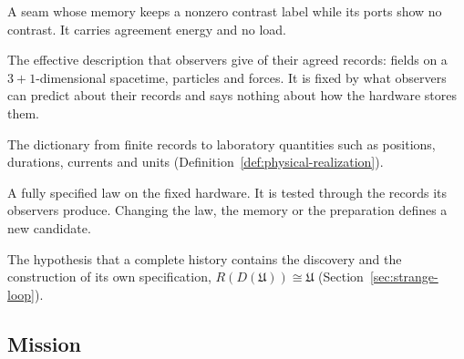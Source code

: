 \documentclass[11pt]{article}
\theoremstyle{definition}
\theoremstyle{remark}
\begin{document}
\begin{description}[leftmargin=1.2em,itemsep=1pt,parsep=0pt]
\item[Unrecovered seam, or collar.] A seam whose memory keeps a nonzero
contrast label while its ports show no contrast. It carries agreement
energy and no load.
\item[Desktop.] The effective description that observers give of their
agreed records: fields on a $3{+}1$-dimensional spacetime, particles and
forces. It is fixed by what observers can predict about their records
and says nothing about how the hardware stores them.
\item[Realization map.] The dictionary from finite records to laboratory
quantities such as positions, durations, currents and units
(Definition~\ref{def:physical-realization}).
\item[Candidate law.] A fully specified law on the fixed hardware. It is
tested through the records its observers produce. Changing the law, the
memory or the preparation defines a new candidate.
\item[Closure.] The hypothesis that a complete history contains the
discovery and the construction of its own specification,
$R(D(\mathfrak U))\cong\mathfrak U$ (Section~\ref{sec:strange-loop}).
\end{description}

\subsection{Mission}
\label{sec:mission}
\end{document}
